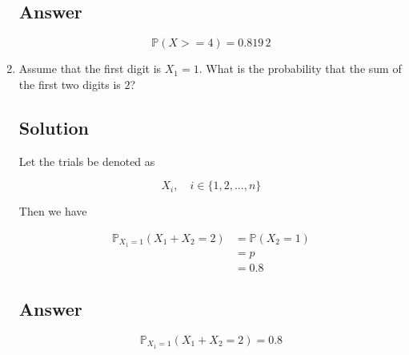 \documentclass[12pt]{article}
\newcommand{\bP}{\mathbb{P}}
\begin{document}
\begin{enumerate}[start=1,label={\bfseries Part \arabic*:},leftmargin=0in]
		\subsection*{Answer}
		
			\[\boxed{\bP(X >= 4) = 0.819\,2}\]
			
		\bigskip\item Assume that the first digit is $X_1 = 1$. What is the probability that the sum of the first two digits is $2$?
		
		\subsection*{Solution}
		
			Let the trials be denoted as
			
			\[X_i,\quad i\in\{1,2,...,n\}\]
			
			Then we have
			
			\[
			\begin{aligned}
				\bP_{X_1=1}(X_1 + X_2 = 2) &= \bP(X_2 = 1)\\
				&= p\\
				&= 0.8
			\end{aligned}
			\]
		
		\subsection*{Answer}
		
			\[\boxed{\bP_{X_1=1}(X_1 + X_2 = 2) = 0.8}\]
	\end{enumerate}
	
\end{document}
